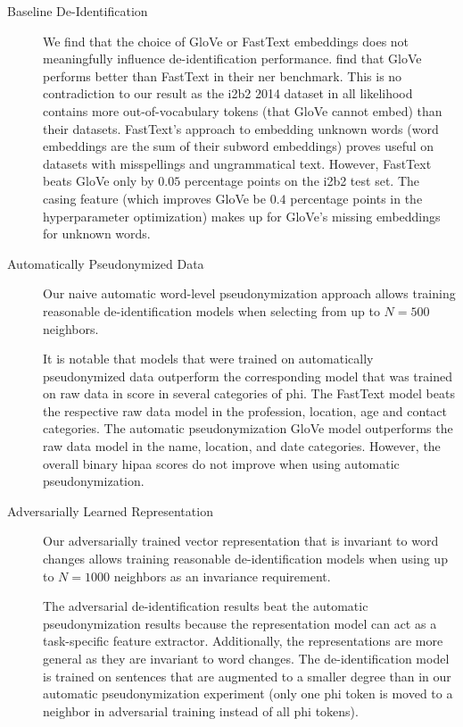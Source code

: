 \begin{description}
    \item[Baseline De-Identification]
    We find that the choice of GloVe or FastText embeddings does not meaningfully influence de-identification performance.
    \citet{reimers2017optimal} find that GloVe performs better than FastText in their \ac{ner} benchmark.
    This is no contradiction to our result as the i2b2 2014 dataset in all likelihood contains more out-of-vocabulary tokens (that GloVe cannot embed) than their datasets.
    FastText's approach to embedding unknown words (word embeddings are the sum of their subword embeddings) proves useful on datasets with misspellings and ungrammatical text.
    However, FastText beats GloVe only by $0.05$ percentage points on the i2b2 test set.
    The casing feature (which improves GloVe be $0.4$ percentage points in the hyperparameter optimization) makes up for GloVe's missing embeddings for unknown words.
        

    \item[Automatically Pseudonymized Data]
    Our naive automatic word-level pseudonymization approach allows training reasonable de-identification models when selecting from up to $N=500$ neighbors.
    
    It is notable that models that were trained on automatically pseudonymized data outperform the corresponding model that was trained on raw data in \fone score in several categories of \ac{phi}.
    The FastText model beats the respective raw data model in the profession, location, age and contact categories.
    The automatic pseudonymization GloVe model outperforms the raw data model in the name, location, and date categories.
    However, the overall binary \ac{hipaa} \fone scores do not improve when using automatic pseudonymization.
    
    \item[Adversarially Learned Representation]
    Our adversarially trained vector representation that is invariant to word changes allows training reasonable de-identification models when using up to $N=1000$ neighbors as an invariance requirement.
    
    The adversarial de-identification results beat the automatic pseudonymization results because the representation model can act as a task-specific feature extractor.
    Additionally, the representations are more general as they are invariant to word changes.
    The de-identification model is trained on sentences that are augmented to a smaller degree than in our automatic pseudonymization experiment (only one \ac{phi} token is moved to a neighbor in adversarial training instead of all \ac{phi} tokens).
    

\end{description}
